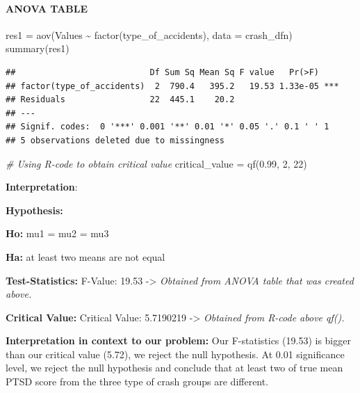 \documentclass[
]{article}
\newenvironment{Shaded}{\begin{snugshade}}{\end{snugshade}}
\newcommand{\AttributeTok}[1]{\textcolor[rgb]{0.77,0.63,0.00}{#1}}
\newcommand{\CommentTok}[1]{\textcolor[rgb]{0.56,0.35,0.01}{\textit{#1}}}
\newcommand{\DecValTok}[1]{\textcolor[rgb]{0.00,0.00,0.81}{#1}}
\newcommand{\FloatTok}[1]{\textcolor[rgb]{0.00,0.00,0.81}{#1}}
\newcommand{\FunctionTok}[1]{\textcolor[rgb]{0.00,0.00,0.00}{#1}}
\newcommand{\NormalTok}[1]{#1}
\newcommand{\OtherTok}[1]{\textcolor[rgb]{0.56,0.35,0.01}{#1}}
\newcommand{\SpecialCharTok}[1]{\textcolor[rgb]{0.00,0.00,0.00}{#1}}
\begin{document}
\hypertarget{anova-table}{%
\paragraph{ANOVA TABLE}\label{anova-table}}

\begin{Shaded}
\begin{Highlighting}[]
\NormalTok{res1 }\OtherTok{=} \FunctionTok{aov}\NormalTok{(Values }\SpecialCharTok{\textasciitilde{}} \FunctionTok{factor}\NormalTok{(type\_of\_accidents), }\AttributeTok{data =}\NormalTok{ crash\_dfn) }
\FunctionTok{summary}\NormalTok{(res1) }
\end{Highlighting}
\end{Shaded}

\begin{verbatim}
##                           Df Sum Sq Mean Sq F value   Pr(>F)    
## factor(type_of_accidents)  2  790.4   395.2   19.53 1.33e-05 ***
## Residuals                 22  445.1    20.2                     
## ---
## Signif. codes:  0 '***' 0.001 '**' 0.01 '*' 0.05 '.' 0.1 ' ' 1
## 5 observations deleted due to missingness
\end{verbatim}

\begin{Shaded}
\begin{Highlighting}[]
\CommentTok{\# Using R{-}code to obtain critical value }
\NormalTok{critical\_value }\OtherTok{=} \FunctionTok{qf}\NormalTok{(}\FloatTok{0.99}\NormalTok{, }\DecValTok{2}\NormalTok{, }\DecValTok{22}\NormalTok{)}
\end{Highlighting}
\end{Shaded}

\textbf{Interpretation}:

\textbf{Hypothesis:}

\textbf{Ho:} mu1 = mu2 = mu3

\textbf{Ha:} at least two means are not equal

\textbf{Test-Statistics:} F-Value: 19.53 -\textgreater{} \emph{Obtained
from ANOVA table that was created above.}

\textbf{Critical Value:} Critical Value: 5.7190219 -\textgreater{}
\emph{Obtained from R-code above qf().}

\textbf{Interpretation in context to our problem:} Our F-statistics
(19.53) is bigger than our critical value (5.72), we reject the null
hypothesis. At 0.01 significance level, we reject the null hypothesis
and conclude that at least two of true mean PTSD score from the three
type of crash groups are different.
\end{document}
